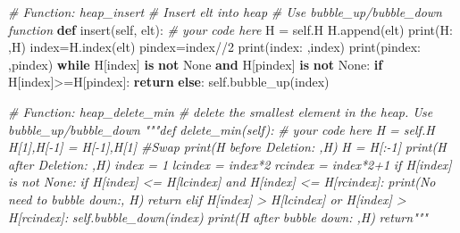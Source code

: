 \documentclass[
]{article}
\newenvironment{Shaded}{}{}
\newcommand{\BuiltInTok}[1]{\textcolor[rgb]{0.00,0.50,0.00}{#1}}
\newcommand{\CommentTok}[1]{\textcolor[rgb]{0.38,0.63,0.69}{\textit{#1}}}
\newcommand{\ControlFlowTok}[1]{\textcolor[rgb]{0.00,0.44,0.13}{\textbf{#1}}}
\newcommand{\DecValTok}[1]{\textcolor[rgb]{0.25,0.63,0.44}{#1}}
\newcommand{\KeywordTok}[1]{\textcolor[rgb]{0.00,0.44,0.13}{\textbf{#1}}}
\newcommand{\NormalTok}[1]{#1}
\newcommand{\OperatorTok}[1]{\textcolor[rgb]{0.40,0.40,0.40}{#1}}
\newcommand{\StringTok}[1]{\textcolor[rgb]{0.25,0.44,0.63}{#1}}
\newcommand{\VariableTok}[1]{\textcolor[rgb]{0.10,0.09,0.49}{#1}}
\begin{document}
\begin{Shaded}
\begin{Highlighting}[]
    \CommentTok{\# Function: heap\_insert}
    \CommentTok{\# Insert elt into heap}
    \CommentTok{\# Use bubble\_up/bubble\_down function}
    \KeywordTok{def}\NormalTok{ insert(}\VariableTok{self}\NormalTok{, elt):}
        \CommentTok{\# your code here}
\NormalTok{        H }\OperatorTok{=} \VariableTok{self}\NormalTok{.H}
\NormalTok{        H.append(elt)}
        \BuiltInTok{print}\NormalTok{(}\StringTok{\textquotesingle{}H: \textquotesingle{}}\NormalTok{,H)}
\NormalTok{        index}\OperatorTok{=}\NormalTok{H.index(elt)}
\NormalTok{        pindex}\OperatorTok{=}\NormalTok{index}\OperatorTok{//}\DecValTok{2}
        \BuiltInTok{print}\NormalTok{(}\StringTok{\textquotesingle{}index: \textquotesingle{}}\NormalTok{,index)}
        \BuiltInTok{print}\NormalTok{(}\StringTok{\textquotesingle{}pindex: \textquotesingle{}}\NormalTok{,pindex)}
        \ControlFlowTok{while}\NormalTok{ H[index] }\KeywordTok{is} \KeywordTok{not} \VariableTok{None} \KeywordTok{and}\NormalTok{ H[pindex] }\KeywordTok{is} \KeywordTok{not} \VariableTok{None}\NormalTok{:}
          \ControlFlowTok{if}\NormalTok{ H[index]}\OperatorTok{\textgreater{}=}\NormalTok{H[pindex]:}
              \ControlFlowTok{return}
          \ControlFlowTok{else}\NormalTok{:}
              \VariableTok{self}\NormalTok{.bubble\_up(index)}





    \CommentTok{\# Function: heap\_delete\_min}
    \CommentTok{\# delete the smallest element in the heap. Use bubble\_up/bubble\_down}
    \CommentTok{"""def delete\_min(self):}
\CommentTok{        \# your code here}
\CommentTok{        H = self.H}
\CommentTok{        H[1],H[{-}1] = H[{-}1],H[1] \#Swap}
\CommentTok{        print(\textquotesingle{}H before Deletion: \textquotesingle{},H)}
\CommentTok{        H = H[:{-}1]}
\CommentTok{        print(\textquotesingle{}H after Deletion: \textquotesingle{},H)}
\CommentTok{        index = 1}
\CommentTok{        lcindex = index*2}
\CommentTok{        rcindex = index*2+1}
\CommentTok{        if H[index] is not None:}
\CommentTok{          if H[index] \textless{}= H[lcindex] and H[index] \textless{}= H[rcindex]:}
\CommentTok{            print(\textquotesingle{}No need to bubble down:\textquotesingle{}, H)}
\CommentTok{            return}
\CommentTok{          elif H[index] \textgreater{} H[lcindex] or H[index] \textgreater{} H[rcindex]:}
\CommentTok{            self.bubble\_down(index)}
\CommentTok{            print(\textquotesingle{}H after bubble down: \textquotesingle{},H)}
\CommentTok{        return"""}


\end{Highlighting}
\end{Shaded}
\end{document}
